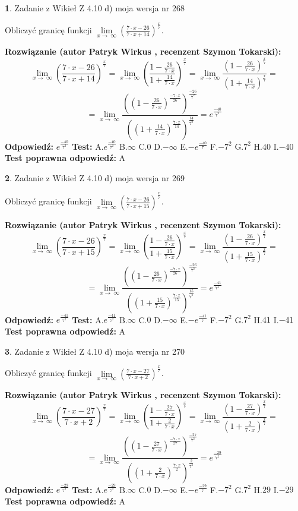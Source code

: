 \documentclass[12pt, a4paper]{article}
\theoremstyle{definition} %
\newtheorem{zad}{}
\newcommand{\zadStart}[1]{\begin{zad}#1\newline}
\newcommand{\zadStop}{\end{zad}}
\newcommand{\rozwStart}[2]{\noindent \textbf{Rozwiązanie (autor #1 , recenzent #2): }\newline}
\newcommand{\rozwStop}{\newline}
\newcommand{\odpStart}{\noindent \textbf{Odpowiedź:}\newline}
\newcommand{\odpStop}{\newline}
\newcommand{\testStart}{\noindent \textbf{Test:}\newline}
\newcommand{\testStop}{\newline}
\newcommand{\kluczStart}{\noindent \textbf{Test poprawna odpowiedź:}\newline}
\newcommand{\kluczStop}{\newline}
\begin{document}
\zadStart{Zadanie z Wikieł Z 4.10 d) moja wersja nr 268}


Obliczyć granicę funkcji  $\lim\limits_{x\to\ \infty}(\frac{7\cdot x-26}{7\cdot x+14})^{\frac{x}{7}}$.
\zadStop
\rozwStart{Patryk Wirkus}{Szymon Tokarski}
$$\lim\limits_{x\to\ \infty}(\frac{7\cdot x-26}{7\cdot x+14})^{\frac{x}{7}} = \lim\limits_{x\to\ \infty}(\frac{1-\frac{26}{7\cdot x}}{1+\frac{14}{7\cdot x}})^{\frac{x}{7}}=\lim\limits_{x\to\ \infty}\frac{(1-\frac{26}{7\cdot x})^{\frac{x}{7}}}{(1+\frac{14}{7\cdot x})^{\frac{x}{7}}}=$$
$$=\lim\limits_{x\to\ \infty}\frac{((1-\frac{26}{7\cdot x})^{\frac{-7\cdot x}{26}})^{\frac{-26}{7^{2}}}}{((1+\frac{14}{7\cdot x})^{\frac{7\cdot x}{14}})^{\frac{14}{7^{2}}}}=e^{\frac{-40}{7^{2}}}$$
\rozwStop
\odpStart
$e^{\frac{-40}{7^{2}}}$
\odpStop
\testStart
A.$e^{\frac{-40}{7^{2}}}$ B.$\infty$ C.$0$ D.$-\infty$ E.$-e^{\frac{-40}{7}}$
F.$-7^{2}$ G.$7^{2}$
H.$40$
I.$-40$
\testStop
\kluczStart
A
\kluczStop



\zadStart{Zadanie z Wikieł Z 4.10 d) moja wersja nr 269}


Obliczyć granicę funkcji  $\lim\limits_{x\to\ \infty}(\frac{7\cdot x-26}{7\cdot x+15})^{\frac{x}{7}}$.
\zadStop
\rozwStart{Patryk Wirkus}{Szymon Tokarski}
$$\lim\limits_{x\to\ \infty}(\frac{7\cdot x-26}{7\cdot x+15})^{\frac{x}{7}} = \lim\limits_{x\to\ \infty}(\frac{1-\frac{26}{7\cdot x}}{1+\frac{15}{7\cdot x}})^{\frac{x}{7}}=\lim\limits_{x\to\ \infty}\frac{(1-\frac{26}{7\cdot x})^{\frac{x}{7}}}{(1+\frac{15}{7\cdot x})^{\frac{x}{7}}}=$$
$$=\lim\limits_{x\to\ \infty}\frac{((1-\frac{26}{7\cdot x})^{\frac{-7\cdot x}{26}})^{\frac{-26}{7^{2}}}}{((1+\frac{15}{7\cdot x})^{\frac{7\cdot x}{15}})^{\frac{15}{7^{2}}}}=e^{\frac{-41}{7^{2}}}$$
\rozwStop
\odpStart
$e^{\frac{-41}{7^{2}}}$
\odpStop
\testStart
A.$e^{\frac{-41}{7^{2}}}$ B.$\infty$ C.$0$ D.$-\infty$ E.$-e^{\frac{-41}{7}}$
F.$-7^{2}$ G.$7^{2}$
H.$41$
I.$-41$
\testStop
\kluczStart
A
\kluczStop



\zadStart{Zadanie z Wikieł Z 4.10 d) moja wersja nr 270}


Obliczyć granicę funkcji  $\lim\limits_{x\to\ \infty}(\frac{7\cdot x-27}{7\cdot x+2})^{\frac{x}{7}}$.
\zadStop
\rozwStart{Patryk Wirkus}{Szymon Tokarski}
$$\lim\limits_{x\to\ \infty}(\frac{7\cdot x-27}{7\cdot x+2})^{\frac{x}{7}} = \lim\limits_{x\to\ \infty}(\frac{1-\frac{27}{7\cdot x}}{1+\frac{2}{7\cdot x}})^{\frac{x}{7}}=\lim\limits_{x\to\ \infty}\frac{(1-\frac{27}{7\cdot x})^{\frac{x}{7}}}{(1+\frac{2}{7\cdot x})^{\frac{x}{7}}}=$$
$$=\lim\limits_{x\to\ \infty}\frac{((1-\frac{27}{7\cdot x})^{\frac{-7\cdot x}{27}})^{\frac{-27}{7^{2}}}}{((1+\frac{2}{7\cdot x})^{\frac{7\cdot x}{2}})^{\frac{2}{7^{2}}}}=e^{\frac{-29}{7^{2}}}$$
\rozwStop
\odpStart
$e^{\frac{-29}{7^{2}}}$
\odpStop
\testStart
A.$e^{\frac{-29}{7^{2}}}$ B.$\infty$ C.$0$ D.$-\infty$ E.$-e^{\frac{-29}{7}}$
F.$-7^{2}$ G.$7^{2}$
H.$29$
I.$-29$
\testStop
\kluczStart
A
\kluczStop
\end{document}
